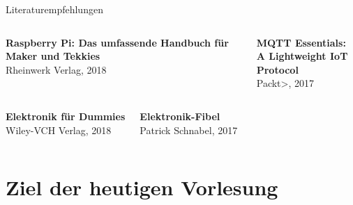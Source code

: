 {\begin{frame}{Literaturempfehlungen}
    \begin{columns}
        \textbf{Raspberry Pi: Das umfassende Handbuch für Maker und Tekkies} \\ Rheinwerk Verlag, 2018

        \textbf{MQTT Essentials: \\ A Lightweight IoT Protocol} \\ Packt>, 2017
    \end{columns}

    \vskip 0.6cm

    \begin{columns}
        \textbf{Elektronik für Dummies} \\ Wiley-VCH Verlag, 2018

        \textbf{Elektronik-Fibel} \\ Patrick Schnabel, 2017
    \end{columns}
\end{frame}
}

\section{Ziel der heutigen Vorlesung}

